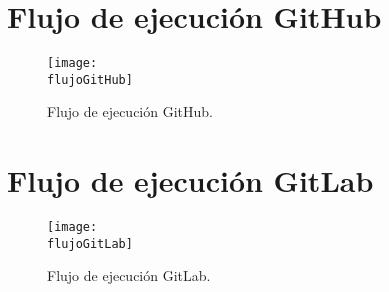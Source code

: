 \section{Flujo de ejecución GitHub}

\begin{figure}[h!]
    \centering
    \texttt{[image: \\flujoGitHub]}
    \caption{Flujo de ejecución GitHub.}
\end{figure}

\newpage

\section{Flujo de ejecución GitLab}

\begin{figure}[h!]
    \centering
    \texttt{[image: \\flujoGitLab]}
    \caption{Flujo de ejecución GitLab.}
\end{figure}